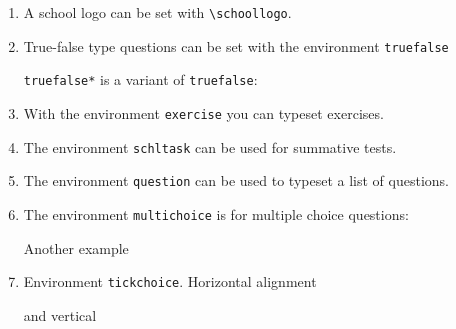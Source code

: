 \documentclass[12pt,a4page]{article}
\def\cellwidth{0.4\textwidth}
\newcommand{\miniexample}[3][t]{%
  \parbox[#1][#3][t]{\cellwidth}{#2}
}
\newcommand{\codeexample}[3][c]{%
  \colorbox[HTML]{b0c4be}{\miniexample[#1]{}{#3}}
}
\newcommand{\textexample}[3][c]{%
  {\footnotesize
    \colorbox[gray]{0.9}{\miniexample[#1]{}{#3}}%
  }
}
\newcommand{\examplerow}[3][10pt]{%
  \par\noindent\strut\hfill\codeexample{#2}{#3}\hspace{#1}\textexample{#2}{#3}\hfill\strut
}
\newlength{\exheight}
\begin{document}
\begin{enumerate}
  \newpage

\item A school logo can be set with \verb|\schoollogo|.
  \setlength{\exheight}{62pt}
  \examplerow{exampleMacroSchoollogo.tex}{\exheight}
\item True-false type questions can be set with the environment \verb|truefalse|\\
  \setlength{\exheight}{85pt}
  \setlength{\truefalselength}{20pt}
  \examplerow{exampleEnvirTruefalse01.tex}{\exheight}
\noindent \verb|truefalse*| is a variant of \verb|truefalse|:
\setlength{\exheight}{95pt}
\setlength{\truefalselength}{30pt}
\examplerow{exampleEnvirTruefalse02.tex}{\exheight}
\item With the environment \texttt{exercise} you can typeset exercises.
  \setlength{\exheight}{193pt}
  \examplerow{exampleEnvirExercise.tex}{\exheight}

  \newpage

\item The environment \texttt{schltask} can be used for summative tests.
  \setlength{\exheight}{86pt}
  \examplerow{exampleEnvirSchltask.tex}{\exheight}
\item The environment \verb|question| can be used to typeset a list of questions.
  \setlength{\exheight}{61pt}
  \examplerow{exampleEnvirQuestion.tex}{\exheight}
\item The environment \verb|multichoice| is for multiple choice questions:
  \setlength{\exheight}{72pt}
  \examplerow{exampleEnvirMultichoice01.tex}{\exheight}

  Another example
  \setlength{\exheight}{85pt}
  \examplerow{exampleEnvirMultichoice02.tex}{\exheight}
\item Environment \texttt{tickchoice}. Horizontal alignment
  \setlength{\exheight}{60pt}
  \examplerow{exampleEnvirTickchoice01.tex}{\exheight}

  and vertical

  \setlength{\exheight}{60pt}
  \examplerow{exampleEnvirTickchoice02.tex}{\exheight}
\end{enumerate}
\end{document}
